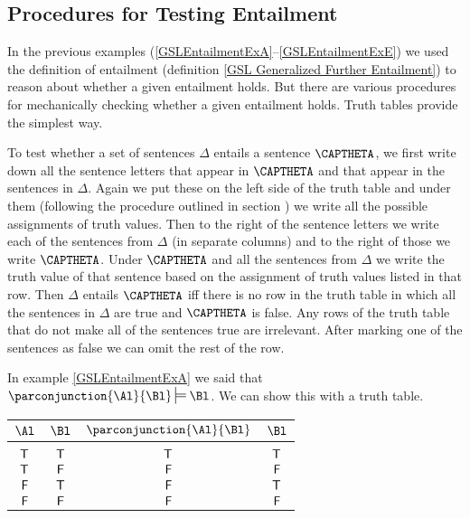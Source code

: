 \subsection{Procedures for Testing Entailment}\label{TestingEntailment}

In the previous examples (\ref{GSLEntailmentExA}--\ref{GSLEntailmentExE}) we used the definition of entailment (definition \ref{GSL Generalized Further Entailment}) to reason about whether a given entailment holds. 
But there are various procedures for mechanically checking whether a given entailment holds. 
Truth tables provide the simplest way. 

To test whether a set of sentences $\Delta$ entails a sentence $\CAPTHETA$, we first write down all the sentence letters that appear in $\CAPTHETA$ and that appear in the sentences in $\Delta$. 
Again we put these on the left side of the truth table and under them (following the procedure outlined in section ) we write all the possible assignments of truth values. 
Then to the right of the sentence letters we write each of the sentences from $\Delta$ (in separate columns) and to the right of those we write $\CAPTHETA$. 
Under $\CAPTHETA$ and all the sentences from $\Delta$ we write the truth value of that sentence based on the assignment of truth values listed in that row. 
Then $\Delta$ entails $\CAPTHETA$ iff there is no row in the truth table in which all the sentences in $\Delta$ are true and $\CAPTHETA$ is false. Any rows of the truth table that do not make all of the  sentences true are irrelevant.  After marking one of the  sentences as false we can omit the rest of the row.
\begin{majorILnc}{}
In example \ref{GSLEntailmentExA} we said that $\parconjunction{\Al}{\Bl}\sdtstile{}{}\Bl$. 
We can show this with a truth table.  
\begin{center}
\begin{tabular}{ c c c c }
$\Al$ & $\Bl$ & $\parconjunction{\Al}{\Bl}$ & $\Bl$ \\
\hline
$ $ & $ $ & & \\[-.25cm]
$\mathsf{T}$ & $\mathsf{T}$ & $\mathsf{T}$ & $\mathsf{T}$ \\
$\mathsf{T}$ & $\mathsf{F}$& $\mathsf{F}$ & $\mathsf{F}$ \\
$\mathsf{F}$ & $\mathsf{T}$ & $\mathsf{F}$ & $\mathsf{T}$ \\
$\mathsf{F}$ & $\mathsf{F}$  & $\mathsf{F}$ & $\mathsf{F}$ \\
\end{tabular}
\end{center}
\end{majorILnc}
